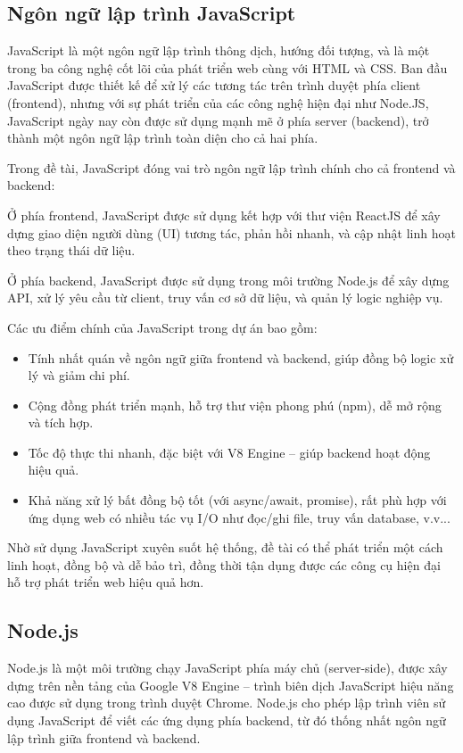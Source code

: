 \documentclass{article}
\begin{document}
	\subsection{Ngôn ngữ lập trình JavaScript}
	
	JavaScript là một ngôn ngữ lập trình thông dịch, hướng đối tượng, và là một trong ba công nghệ cốt lõi của phát triển web cùng với HTML và CSS. Ban đầu JavaScript được thiết kế để xử lý các tương tác trên trình duyệt phía client (frontend), nhưng với sự phát triển của các công nghệ hiện đại như Node.JS, JavaScript ngày nay còn được sử dụng mạnh mẽ ở phía server (backend), trở thành một ngôn ngữ lập trình toàn diện cho cả hai phía.
	
	Trong đề tài, JavaScript đóng vai trò ngôn ngữ lập trình chính cho cả frontend và backend:
	
	Ở phía frontend, JavaScript được sử dụng kết hợp với thư viện ReactJS để xây dựng giao diện người dùng (UI) tương tác, phản hồi nhanh, và cập nhật linh hoạt theo trạng thái dữ liệu.
	
	Ở phía backend, JavaScript được sử dụng trong môi trường Node.js để xây dựng API, xử lý yêu cầu từ client, truy vấn cơ sở dữ liệu, và quản lý logic nghiệp vụ.
	
	Các ưu điểm chính của JavaScript trong dự án bao gồm:
	\begin{itemize}
		\item Tính nhất quán về ngôn ngữ giữa frontend và backend, giúp đồng bộ logic xử lý và giảm chi phí.
		\item Cộng đồng phát triển mạnh, hỗ trợ thư viện phong phú (npm), dễ mở rộng và tích hợp.
		\item Tốc độ thực thi nhanh, đặc biệt với V8 Engine – giúp backend hoạt động hiệu quả.
		\item Khả năng xử lý bất đồng bộ tốt (với async/await, promise), rất phù hợp với ứng dụng web có nhiều tác vụ I/O như đọc/ghi file, truy vấn database, v.v...
	\end{itemize}
	
	Nhờ sử dụng JavaScript xuyên suốt hệ thống, đề tài có thể phát triển một cách linh hoạt, đồng bộ và dễ bảo trì, đồng thời tận dụng được các công cụ hiện đại hỗ trợ phát triển web hiệu quả hơn.
	
	\subsection{Node.js}
	
	Node.js là một môi trường chạy JavaScript phía máy chủ (server-side), được xây dựng trên nền tảng của Google V8 Engine – trình biên dịch JavaScript hiệu năng cao được sử dụng trong trình duyệt Chrome. Node.js cho phép lập trình viên sử dụng JavaScript để viết các ứng dụng phía backend, từ đó thống nhất ngôn ngữ lập trình giữa frontend và backend.
	
\end{document}
